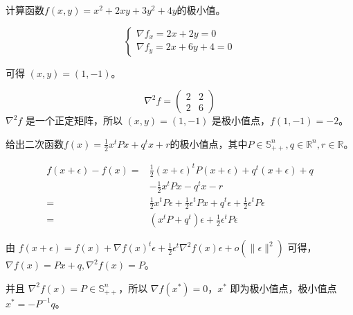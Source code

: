 \begin{problem}
	计算函数$f(x,y)=x^2+2xy+3y^2+4y$的极小值。
\end{problem}
\begin{solution}
	$$\left\{\begin{matrix} 
		\nabla f_x = 2x + 2y = 0\\
		\nabla f_y = 2x + 6y + 4 = 0
	\end{matrix}\right.$$

	可得 $(x, y) = (1, -1)$。
	
	$$\nabla^2f = \begin{pmatrix}
		2 & 2\\
		2 & 6
	\end{pmatrix}$$ 
	$\nabla^2f$ 是一个正定矩阵，所以 $(x, y) = (1, -1)$ 是极小值点，$f(1, -1) = -2$。
\end{solution}


\begin{problem}
	给出二次函数$f(x)=\frac{1}{2}x^tPx+q^tx+r$的极小值点，其中$P\in\mathbb{S}_{++}^n,q\in\mathbb{R}^n,r\in\mathbb{R}$。
\end{problem}
\begin{solution}
	$$\begin{aligned}
		f(x + \epsilon) - f(x) =& \frac{1}{2} (x + \epsilon)^tP(x + \epsilon) + q^t(x + \epsilon) + q \\
		& -\frac{1}{2} x^tPx - q^tx - r\\
		=& \frac{1}{2}x^tP\epsilon + \frac{1}{2}\epsilon^tPx + q^t\epsilon + \frac{1}{2}\epsilon^tP\epsilon\\
		=& (x^tP + q^t)\epsilon + \frac{1}{2}\epsilon^tP\epsilon
	\end{aligned}$$
	
	由 $f(x + \epsilon) = f(x) + \nabla f(x)^t\epsilon + \frac{1}{2}\epsilon^t \nabla^2 f(x) \epsilon + o(\|\epsilon\|^2)$ 可得，$\nabla f(x) = Px + q, \nabla^2 f(x) = P$。
	
	并且 $\nabla^2 f(x) = P\in \mathbb{S}^n_{++}$，所以 $\nabla f(x^*) = 0$，$x^*$ 即为极小值点，极小值点 $x^* = -P^{-1}q$。
\end{solution}


